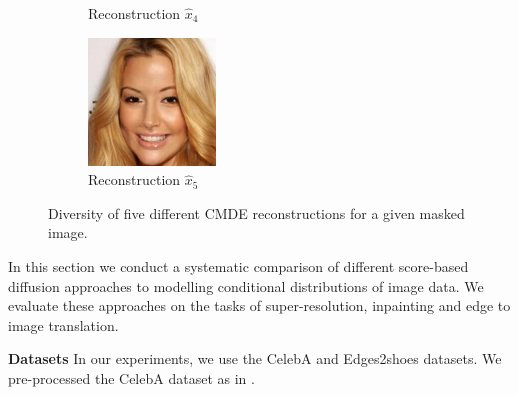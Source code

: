 \begin{figure}
\begin{subfigure}{.135\textwidth}
        \caption{\scriptsize Reconstruction $\hat{x}_4$}
    \end{subfigure}
    \begin{subfigure}{.135\textwidth}
        \includegraphics[width=\textwidth]{Chapter2/samples/diversity/5.png}
        \caption{\scriptsize Reconstruction $\hat{x}_5$}
    \end{subfigure} 
    \caption{Diversity of five different CMDE reconstructions for a given masked image.}
\end{figure}

In this section we conduct a systematic comparison of different score-based diffusion approaches to modelling conditional distributions of image data. We evaluate these approaches on the tasks of super-resolution, inpainting and edge to image translation.

\noindent
\textbf{Datasets} In our experiments, we use the CelebA \cite{2015celeba} and Edges2shoes \cite{yu2014sketch2shoe,isola2018pix2pix} datasets. We pre-processed the CelebA dataset as in \cite{liang2021hrflow}.

